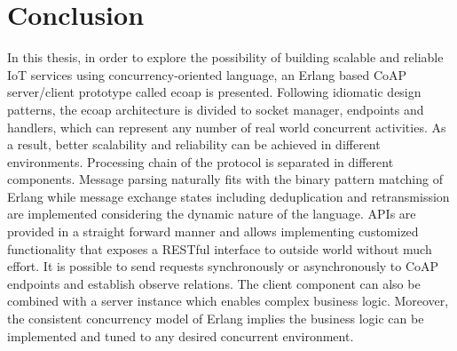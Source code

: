 \chapter{Conclusion}\label{ch6}

In this thesis, in order to explore the possibility of building scalable and reliable IoT services using concurrency-oriented language, an Erlang based CoAP server/client prototype called ecoap is presented. Following idiomatic design patterns, the ecoap architecture is divided to socket manager, endpoints and handlers, which can represent any number of real world concurrent activities. As a result, better scalability and reliability can be achieved in different environments. Processing chain of the protocol is separated in different components. Message parsing naturally fits with the binary pattern matching of Erlang while message exchange states including deduplication and retransmission are implemented considering the dynamic nature of the language. APIs are provided in a straight forward manner and allows implementing customized functionality that exposes a RESTful interface to outside world without much effort. It is possible to send requests synchronously or asynchronously to CoAP endpoints and establish observe relations. The client component can also be combined with a server instance which enables complex business logic. Moreover, the consistent concurrency model of Erlang implies the business logic can be implemented and tuned to any desired concurrent environment.

